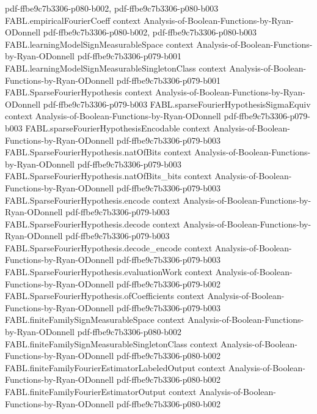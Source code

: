\begin{theorem}
  {pdf-ffbe9c7b3306-p080-b002,
    pdf-ffbe9c7b3306-p080-b003}
\proofstep
  {FABL.empiricalFourierCoeff}
  {context}
  {Analysis-of-Boolean-Functions-by-Ryan-ODonnell}
  {pdf-ffbe9c7b3306-p080-b002,
    pdf-ffbe9c7b3306-p080-b003}
\proofstep
  {FABL.learningModelSignMeasurableSpace}
  {context}
  {Analysis-of-Boolean-Functions-by-Ryan-ODonnell}
  {pdf-ffbe9c7b3306-p079-b001}
\proofstep
  {FABL.learningModelSignMeasurableSingletonClass}
  {context}
  {Analysis-of-Boolean-Functions-by-Ryan-ODonnell}
  {pdf-ffbe9c7b3306-p079-b001}
\proofstep
  {FABL.SparseFourierHypothesis}
  {context}
  {Analysis-of-Boolean-Functions-by-Ryan-ODonnell}
  {pdf-ffbe9c7b3306-p079-b003}
\proofstep
  {FABL.sparseFourierHypothesisSigmaEquiv}
  {context}
  {Analysis-of-Boolean-Functions-by-Ryan-ODonnell}
  {pdf-ffbe9c7b3306-p079-b003}
\proofstep
  {FABL.sparseFourierHypothesisEncodable}
  {context}
  {Analysis-of-Boolean-Functions-by-Ryan-ODonnell}
  {pdf-ffbe9c7b3306-p079-b003}
\proofstep
  {FABL.SparseFourierHypothesis.natOfBits}
  {context}
  {Analysis-of-Boolean-Functions-by-Ryan-ODonnell}
  {pdf-ffbe9c7b3306-p079-b003}
\proofstep
  {FABL.SparseFourierHypothesis.natOfBits_bits}
  {context}
  {Analysis-of-Boolean-Functions-by-Ryan-ODonnell}
  {pdf-ffbe9c7b3306-p079-b003}
\proofstep
  {FABL.SparseFourierHypothesis.encode}
  {context}
  {Analysis-of-Boolean-Functions-by-Ryan-ODonnell}
  {pdf-ffbe9c7b3306-p079-b003}
\proofstep
  {FABL.SparseFourierHypothesis.decode}
  {context}
  {Analysis-of-Boolean-Functions-by-Ryan-ODonnell}
  {pdf-ffbe9c7b3306-p079-b003}
\proofstep
  {FABL.SparseFourierHypothesis.decode_encode}
  {context}
  {Analysis-of-Boolean-Functions-by-Ryan-ODonnell}
  {pdf-ffbe9c7b3306-p079-b003}
\proofstep
  {FABL.SparseFourierHypothesis.evaluationWork}
  {context}
  {Analysis-of-Boolean-Functions-by-Ryan-ODonnell}
  {pdf-ffbe9c7b3306-p079-b002}
\proofstep
  {FABL.SparseFourierHypothesis.ofCoefficients}
  {context}
  {Analysis-of-Boolean-Functions-by-Ryan-ODonnell}
  {pdf-ffbe9c7b3306-p079-b003}
\proofstep
  {FABL.finiteFamilySignMeasurableSpace}
  {context}
  {Analysis-of-Boolean-Functions-by-Ryan-ODonnell}
  {pdf-ffbe9c7b3306-p080-b002}
\proofstep
  {FABL.finiteFamilySignMeasurableSingletonClass}
  {context}
  {Analysis-of-Boolean-Functions-by-Ryan-ODonnell}
  {pdf-ffbe9c7b3306-p080-b002}
\proofstep
  {FABL.finiteFamilyFourierEstimatorLabeledOutput}
  {context}
  {Analysis-of-Boolean-Functions-by-Ryan-ODonnell}
  {pdf-ffbe9c7b3306-p080-b002}
\proofstep
  {FABL.finiteFamilyFourierEstimatorOutput}
  {context}
  {Analysis-of-Boolean-Functions-by-Ryan-ODonnell}
  {pdf-ffbe9c7b3306-p080-b002}

\end{theorem}
